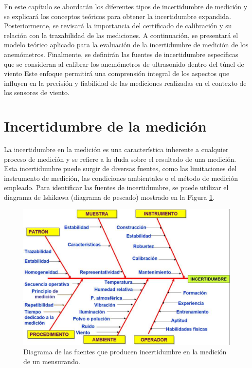 En este capítulo se abordarán los diferentes tipos de incertidumbre de medición y se explicará los conceptos teóricos para obtener la incertidumbre expandida. Posteriormente, se revisará la importancia del certificado de calibración y su relación con la trazabilidad de las mediciones. A continuación, se presentará el modelo teórico aplicado para la evaluación de la incertidumbre de medición de los anemómetros. Finalmente, se definirán las fuentes de incertidumbre específicas que se consideran al calibrar los anemómetros de ultrasonido dentro del túnel de viento  Este enfoque permitirá una comprensión integral de los aspectos que influyen en la precisión y fiabilidad de las mediciones realizadas en el contexto de los sensores de viento.

\section{Incertidumbre de la medición}\label{sec:tipos_incertidumbre}

La incertidumbre en la medición es una característica inherente a cualquier proceso de medición y se refiere a la duda sobre el resultado de una medición. Esta incertidumbre puede surgir de diversas fuentes, como las limitaciones del instrumento de medición, las condiciones ambientales o el método de medición empleado. Para identificar las fuentes de incertidumbre, se puede utilizar el diagrama de Ishikawa (diagrama de pescado) mostrado en la Figura \ref{fig:diagramaPescado}.

\begin{figure}[H]
    \centering
    \includegraphics[width=0.8\linewidth]{Figuras/calculoIncertidumbre/diagramaPescado.png}
    \caption{Diagrama de las fuentes que producen incertidumbre en la medición de un mensurando. \cite{instrumentosMedicionesFiuba}}
    \label{fig:diagramaPescado}
\end{figure}

